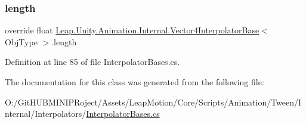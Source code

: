 \subsubsection{\texorpdfstring{length}{length}}
{\footnotesize\ttfamily override float \mbox{\hyperlink{class_leap_1_1_unity_1_1_animation_1_1_internal_1_1_vector4_interpolator_base}{Leap.\+Unity.\+Animation.\+Internal.\+Vector4\+Interpolator\+Base}}$<$ Obj\+Type $>$.length\hspace{0.3cm}{\ttfamily [get]}}



Definition at line 85 of file Interpolator\+Bases.\+cs.



The documentation for this class was generated from the following file\+:\begin{DoxyCompactItemize}
\item 
O\+:/\+Git\+H\+U\+B\+M\+I\+N\+I\+P\+Roject/\+Assets/\+Leap\+Motion/\+Core/\+Scripts/\+Animation/\+Tween/\+Internal/\+Interpolators/\mbox{\hyperlink{_interpolator_bases_8cs}{Interpolator\+Bases.\+cs}}\end{DoxyCompactItemize}
